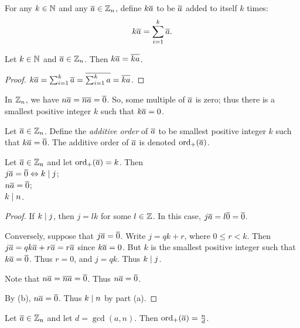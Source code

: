 \documentclass{amsart}
\begin{document}
For any $k \in \mathbb{N}$ and any $\overline{a} \in \mathbb{Z}_{n}$, define $k\overline{a}$
to be $\overline{a}$ added to itself $k$ times:
\[ k\overline{a} = \sum_{i=1}^{k} \overline{a} . \]

\begin{Prop}
Let $k \in \mathbb{N}$ and $\overline{a} \in \mathbb{Z}_{n}$. Then $k\overline{a} =
\overline{ka}$.
\end{Prop}

\begin{proof}
$k\overline{a} = \sum_{i=1}^{k} \overline{a} = \overline{\sum_{i=1}^{k} a} = \overline{ka}$.
\end{proof}

In $\mathbb{Z}_n$, we have $n \overline{a} = \overline{na} = \overline{0}$.
So, some multiple of $\overline{a}$ is zero; thus there is a smallest positive integer $k$
such that $k\overline{a} = 0$.

\begin{Def}
Let $\overline{a} \in \mathbb{Z}_{n}$. Define the {\em additive order} of $\overline{a}$ to be
smallest positive integer $k$ such that $k\overline{a} = \overline{0}$.  The additive
order of $\overline{a}$ is denoted $\text{\rm{ord}}_+(\overline{a})$.
\end{Def}

\begin{Prop}
Let $\overline{a} \in \mathbb{Z}_{n}$ and let $\text{\rm{ord}}_+(\overline{a}) = k$.
Then \\
 $j\overline{a} = \overline{0} \Leftrightarrow k \mid j$; \\
 $n\overline{a} = \overline{0}$; \\
 $k \mid n$.
\end{Prop}

\begin{proof}
\text{ }

 If $k \mid j$, then $j = lk$ for some $l \in \mathbb{Z}$. In
this case, $j\overline{a} = l\overline{0} = \overline{0}$.

Conversely, suppose that $j\overline{a} = \overline{0}$.
Write $j = qk + r$, where $0 \le r < k$.
Then $j\overline{a} = qk\overline{a} + r\overline{a} = r\overline{a}$ since $k\overline{a} = 0$.
But $k$ is the smallest positive integer such that $k\overline{a} = \overline{0}$.
Thus $r = 0$, and $j = qk$.  Thus $k \mid j$.

Note that $n\overline{a} = \overline{na} = \overline{0}$.
Thus $n\overline{a} = \overline{0}$.

By (b), $n\overline{a} = \overline{0}$.
Thus $k \mid n$ by part (a).
\end{proof}

\begin{Prop}
Let $\overline{a} \in \mathbb{Z}_{n}$ and let $d = \gcd(a,n)$. Then $\text{\rm{ord}}_+(\overline{a}) = \frac{n}{d}$.
\end{Prop}
\end{document}
